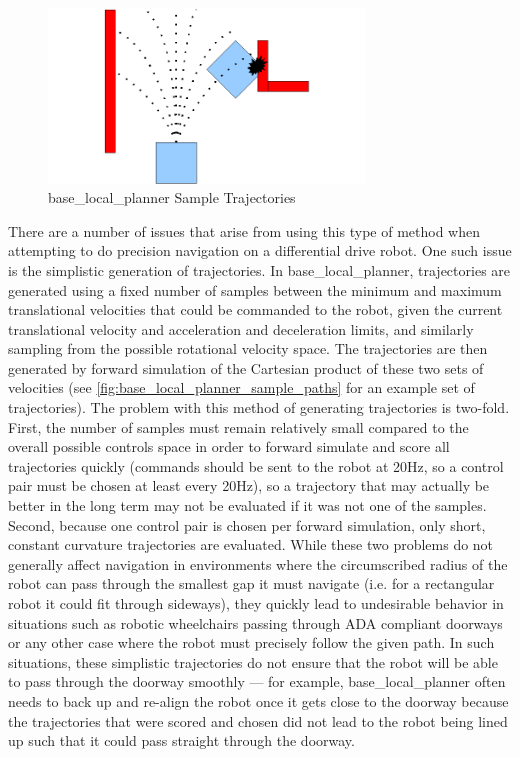 \begin{figure}
\centering
\includegraphics[width=0.75\textwidth]{images/base_local_planner_sample_paths}
\caption[base\_local\_planner Sample Trajectories]{base\_local\_planner Sample Trajectories \autocite{BaseLocalPlannerWiki} \label{fig:base_local_planner_sample_paths}}
\end{figure}

There are a number of issues that arise from using this type of method when attempting to do precision navigation on a differential drive robot. One such issue is the simplistic generation of trajectories. In base\_local\_planner, trajectories are generated using a fixed number of samples between the minimum and maximum translational velocities that could be commanded to the robot, given the current translational velocity and acceleration and deceleration limits, and similarly sampling from the possible rotational velocity space. The trajectories are then generated by forward simulation of the Cartesian product of these two sets of velocities (see \autoref{fig:base_local_planner_sample_paths} for an example set of trajectories). The problem with this method of generating trajectories is two-fold. First, the number of samples must remain relatively small compared to the overall possible controls space in order to forward simulate and score all trajectories quickly (commands should be sent to the robot at 20Hz, so a control pair must be chosen at least every 20Hz), so a trajectory that may actually be better in the long term may not be evaluated if it was not one of the samples. Second, because one control pair is chosen per forward simulation, only short, constant curvature trajectories are evaluated. While these two problems do not generally affect navigation in environments where the circumscribed radius of the robot can pass through the smallest gap it must navigate (i.e. for a rectangular robot it could fit through sideways), they quickly lead to undesirable behavior in situations such as robotic wheelchairs passing through ADA compliant doorways or any other case where the robot must precisely follow the given path. In such situations, these simplistic trajectories do not ensure that the robot will be able to pass through the doorway smoothly --- for example, base\_local\_planner often needs to back up and re-align the robot once it gets close to the doorway because the trajectories that were scored and chosen did not lead to the robot being lined up such that it could pass straight through the doorway. 

